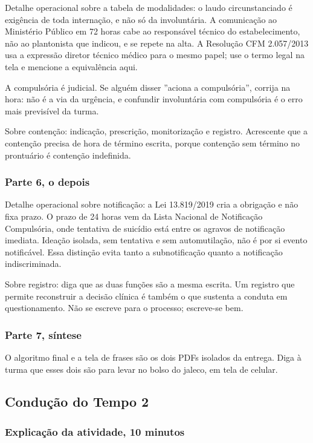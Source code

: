 Detalhe operacional sobre a tabela de modalidades: o laudo circunstanciado é exigência de toda internação, e não só da involuntária. A comunicação ao Ministério Público em 72 horas cabe ao responsável técnico do estabelecimento, não ao plantonista que indicou, e se repete na alta. A Resolução CFM 2.057/2013 usa a expressão diretor técnico médico para o mesmo papel; use o termo legal na tela e mencione a equivalência aqui.

A compulsória é judicial. Se alguém disser ''aciona a compulsória'', corrija na hora: não é a via da urgência, e confundir involuntária com compulsória é o erro mais previsível da turma.

Sobre contenção: indicação, prescrição, monitorização e registro. Acrescente que a contenção precisa de hora de término escrita, porque contenção sem término no prontuário é contenção indefinida.

\subsubsection*{Parte 6, o depois}

Detalhe operacional sobre notificação: a Lei 13.819/2019 cria a obrigação e não fixa prazo. O prazo de 24 horas vem da Lista Nacional de Notificação Compulsória, onde tentativa de suicídio está entre os agravos de notificação imediata. Ideação isolada, sem tentativa e sem automutilação, não é por si evento notificável. Essa distinção evita tanto a subnotificação quanto a notificação indiscriminada.

Sobre registro: diga que as duas funções são a mesma escrita. Um registro que permite reconstruir a decisão clínica é também o que sustenta a conduta em questionamento. Não se escreve para o processo; escreve-se bem.

\subsubsection*{Parte 7, síntese}

O algoritmo final e a tela de frases são os dois PDFs isolados da entrega. Diga à turma que esses dois são para levar no bolso do jaleco, em tela de celular.

\filete

\subsection*{Condução do Tempo 2}

\subsubsection*{Explicação da atividade, 10 minutos}

